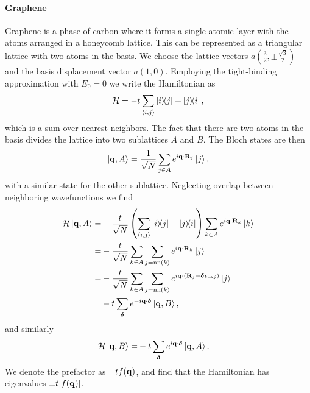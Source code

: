 \paragraph{Graphene}
Graphene is a phase of carbon where it forms a single atomic layer with the atoms arranged in a honeycomb lattice. This can be represented as a triangular lattice with two atoms in the basis. We choose the lattice vectors $a\left(\frac{3}{2}, \pm\frac{\sqrt{3}}{2}\right)$ and the basis displacement vector $a(1, 0)$. Employing the tight-binding approximation with $E_{0} = 0$ we write the Hamiltonian as
\begin{align*}
	\mathcal{H} = -t\sum\limits_{\expval{i, j}}\op{i}{j} + \op{j}{i},
\end{align*}
which is a sum over nearest neighbors. The fact that there are two atoms in the basis divides the lattice into two sublattices $A$ and $B$. The Bloch states are then
\begin{align*}
	\ket{\vb{q}, A} = \frac{1}{\sqrt{N}}\sum\limits_{j\in A}e^{i\vb{q}\cdot\vb{R}_{j}}\ket{j},
\end{align*}
with a similar state for the other sublattice. Neglecting overlap between neighboring wavefunctions we find
\begin{align*}
	\mathcal{H}\ket{\vb{q}, A} =& -\frac{t}{\sqrt{N}}\left(\sum\limits_{\expval{i, j}}\op{i}{j} + \op{j}{i}\right)\sum\limits_{k\in A}e^{i\vb{q}\cdot\vb{R}_{k}}\ket{k} \\
	                    =& -\frac{t}{\sqrt{N}}\sum\limits_{k\in A}\sum\limits_{j = \text{nn}(k)}e^{i\vb{q}\cdot\vb{R}_{k}}\ket{j} \\
	                    =& -\frac{t}{\sqrt{N}}\sum\limits_{k\in A}\sum\limits_{j = \text{nn}(k)}e^{i\vb{q}\cdot(\vb{R}_{j} - \vb*{\delta}_{k\to j})}\ket{j} \\
	                    =& -t\sum\limits_{\vb*{\delta}}e^{-i\vb{q}\cdot\vb*{\delta}}\ket{\vb{q}, B},
\end{align*}
and similarly
\begin{align*}
	\mathcal{H}\ket{\vb{q}, B} =& -t\sum\limits_{\vb*{\delta}}e^{i\vb{q}\cdot\vb*{\delta}}\ket{\vb{q}, A}.
\end{align*}
We denote the prefactor as $-tf(\vb{q})$, and find that the Hamiltonian has eigenvalues $\pm t\abs{f(\vb{q})}$.

